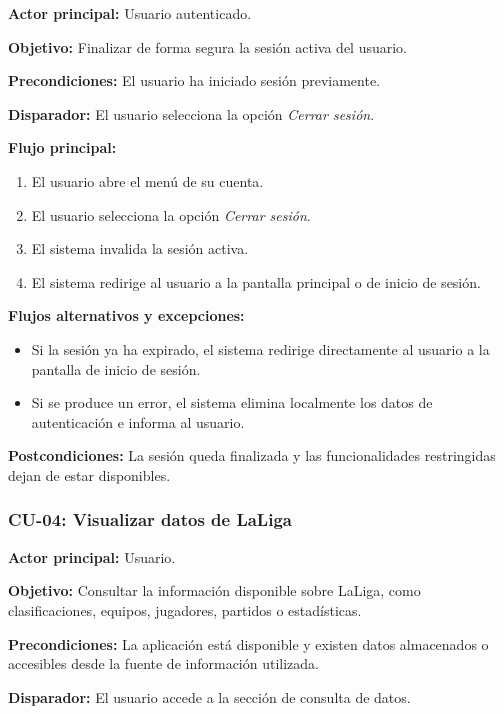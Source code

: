 \noindent \textbf{Actor principal:} Usuario autenticado.

\noindent \textbf{Objetivo:} Finalizar de forma segura la sesión activa del usuario.

\noindent \textbf{Precondiciones:} El usuario ha iniciado sesión previamente.

\noindent \textbf{Disparador:} El usuario selecciona la opción \textit{Cerrar sesión}.

\noindent \textbf{Flujo principal:}
\begin{enumerate}
    \item El usuario abre el menú de su cuenta.
    \item El usuario selecciona la opción \textit{Cerrar sesión}.
    \item El sistema invalida la sesión activa.
    \item El sistema redirige al usuario a la pantalla principal o de inicio de sesión.
\end{enumerate}

\noindent \textbf{Flujos alternativos y excepciones:}
\begin{itemize}
    \item Si la sesión ya ha expirado, el sistema redirige directamente al usuario a la pantalla de inicio de sesión.
    \item Si se produce un error, el sistema elimina localmente los datos de autenticación e informa al usuario.
\end{itemize}

\noindent \textbf{Postcondiciones:} La sesión queda finalizada y las funcionalidades restringidas dejan de estar disponibles.

\subsubsection{CU-04: Visualizar datos de LaLiga}

\noindent \textbf{Actor principal:} Usuario.

\noindent \textbf{Objetivo:} Consultar la información disponible sobre LaLiga, como clasificaciones, equipos, jugadores, partidos o estadísticas.

\noindent \textbf{Precondiciones:} La aplicación está disponible y existen datos almacenados o accesibles desde la fuente de información utilizada.

\noindent \textbf{Disparador:} El usuario accede a la sección de consulta de datos.

